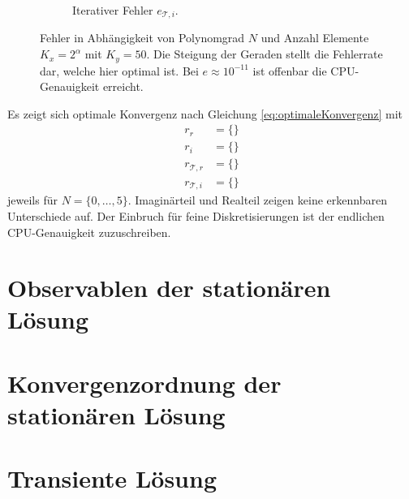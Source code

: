 \begin{figure}
\begin{subfigure}[b]{0.475\textwidth}
        \caption[]%
        {{\small Iterativer Fehler $e_{\mathcal{T},i}$.}}
    \end{subfigure}
    \caption[]
    {Fehler in Abhängigkeit von Polynomgrad $N$ und Anzahl Elemente $K_x=2^{\alpha}$ mit $K_y=50$. Die Steigung der Geraden stellt die Fehlerrate dar, welche hier optimal ist. Bei $e\approx10^{-11}$ ist offenbar die CPU-Genauigkeit erreicht.}
    \label{fig:testResult}
\end{figure}
Es zeigt sich optimale Konvergenz nach Gleichung \eqref{eq:optimaleKonvergenz} mit
\begin{align*}
  r_r &= \{\} \\
  r_i &= \{\} \\
  r_{\mathcal{T},r} &= \{\} \\
  r_{\mathcal{T},i} &= \{\}
\end{align*}
jeweils für $N=\{0,\dots,5\}$. Imaginärteil und Realteil zeigen keine erkennbaren Unterschiede auf. Der Einbruch für feine Diskretisierungen ist der endlichen CPU-Genauigkeit zuzuschreiben.

\section{Observablen der stationären Lösung}\label{sec:IV}


\section{Konvergenzordnung der stationären Lösung}\label{sec:rates}


\section{Transiente Lösung}\label{sec:transient}
